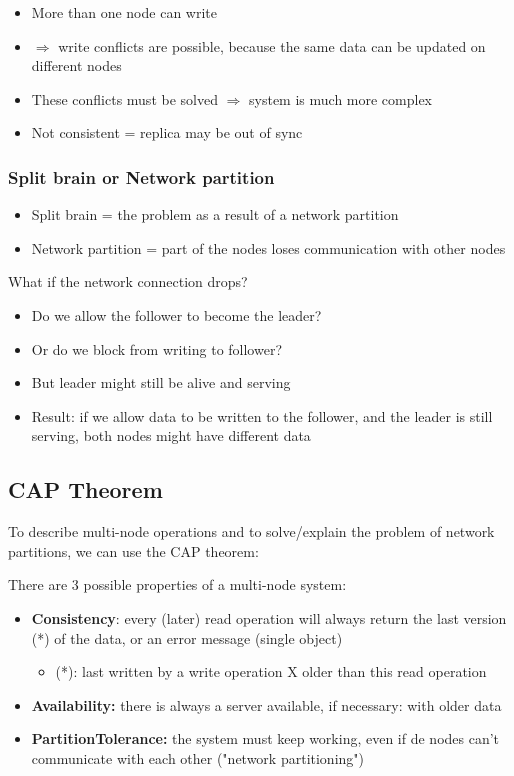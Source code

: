 \documentclass{article}
\begin{document}
\begin{itemize}
    \item More than one node can write
    \item $\Rightarrow$ write conflicts are possible, because the same data can be updated on different nodes
    \item These conflicts must be solved $\Rightarrow$ system is much more complex
    \item Not consistent = replica may be out of sync
\end{itemize}

\subsubsection{Split brain or Network partition}

\begin{itemize}
    \item Split brain = the problem as a result of a network partition
    \item Network partition = part of the nodes loses communication with other nodes
\end{itemize}

What if the network connection drops?

\begin{itemize}
    \item Do we allow the follower to become the leader?
    \item Or do we block from writing to follower?
    \item But leader might still be alive and serving
    \item Result: if we allow data to be written to the follower, and the leader is still serving, both nodes might have different data
\end{itemize}

\subsection{CAP Theorem}

To describe multi-node operations and to solve/explain the problem of network partitions, we can use the CAP theorem:

There are 3 possible properties of a multi-node system:

\begin{itemize}
    \item \textbf{Consistency}: every (later) read operation will always return the last version (*) of the data, or an error message (single object)
    \begin{itemize}
        \item (*): last written by a write operation X older than this read operation
    \end{itemize}
    \item \textbf{Availability:} there is always a server available, if necessary: with older data
    \item \textbf{PartitionTolerance:} the system must keep working, even if de nodes can't communicate with each other ("network partitioning")
\end{itemize}
\end{document}
